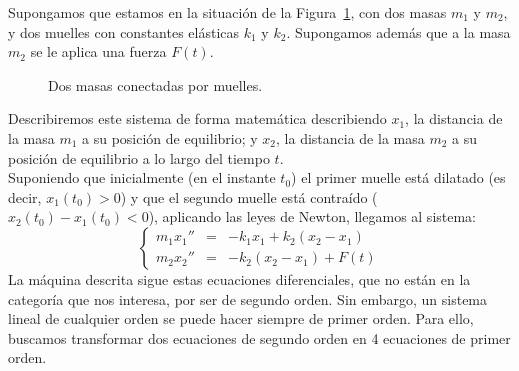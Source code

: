 \begin{ejemplo}
    Supongamos que estamos en la situación de la Figura~\ref{fig:muelles}, con dos masas $m_1$ y $m_2$, y dos muelles con constantes elásticas $k_1$ y $k_2$. Supongamos además que a la masa $m_2$ se le aplica una fuerza $F(t)$.
\begin{figure}[H]
    \centering
    \caption{Dos masas conectadas por muelles.}
    \label{fig:muelles}
\end{figure}
    Describiremos este sistema de forma matemática describiendo $x_1$, la distancia de la masa $m_1$ a su posición de equilibrio; y $x_2$, la distancia de la masa $m_2$ a su posición de equilibrio a lo largo del tiempo $t$.\\

    Suponiendo que inicialmente (en el instante $t_0$) el primer muelle está dilatado (es decir, $x_1(t_0) > 0$) y que el segundo muelle está contraído ($x_2(t_0) - x_1(t_0)<0$), aplicando las leyes de Newton, llegamos al sistema:
    \begin{equation*}
        \left\{\begin{array}{rcl}
                m_1 x_1 '' &=& -k_1 x_1 + k_2 (x_2 - x_1) \\
                m_2 x_2 '' &=& -k_2(x_2 - x_1) + F(t)
        \end{array}\right.
    \end{equation*}
    La máquina descrita sigue estas ecuaciones diferenciales, que no están en la categoría que nos interesa, por ser de segundo orden. Sin embargo, un sistema lineal de cualquier orden se puede hacer siempre de primer orden. Para ello, buscamos transformar dos ecuaciones de segundo orden en 4 ecuaciones de primer orden.\\


\end{ejemplo}
